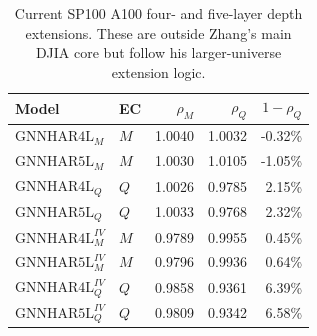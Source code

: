 \begin{table}[H]
\centering
\small
\begin{tabular}{llrrr}
\toprule
Model & EC & \(\rho_M\) & \(\rho_Q\) & \(1-\rho_Q\) \\
\midrule
\(\mathrm{GNNHAR4L}_{M}\) & \(M\) & 1.0040 & 1.0032 & -0.32\% \\
\(\mathrm{GNNHAR5L}_{M}\) & \(M\) & 1.0030 & 1.0105 & -1.05\% \\
\(\mathrm{GNNHAR4L}_{Q}\) & \(Q\) & 1.0026 & 0.9785 & 2.15\% \\
\(\mathrm{GNNHAR5L}_{Q}\) & \(Q\) & 1.0033 & 0.9768 & 2.32\% \\
\(\mathrm{GNNHAR4L}_{M}^{IV}\) & \(M\) & 0.9789 & 0.9955 & 0.45\% \\
\(\mathrm{GNNHAR5L}_{M}^{IV}\) & \(M\) & 0.9796 & 0.9936 & 0.64\% \\
\(\mathrm{GNNHAR4L}_{Q}^{IV}\) & \(Q\) & 0.9858 & 0.9361 & 6.39\% \\
\(\mathrm{GNNHAR5L}_{Q}^{IV}\) & \(Q\) & 0.9809 & 0.9342 & 6.58\% \\
\bottomrule
\end{tabular}
\caption{Current SP100 A100 four- and five-layer depth extensions.  These are outside Zhang's main DJIA core but follow his larger-universe extension logic.}
\label{tab:sp100-a100-depth-loss}
\end{table}
